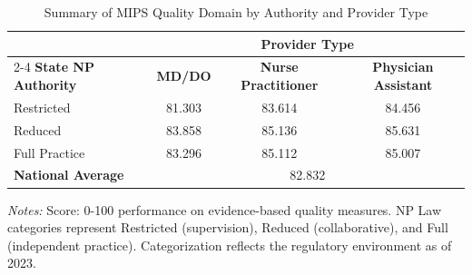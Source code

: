 \begin{table}[htbp]
    \centering
    \caption{Summary of MIPS Quality Domain by Authority and Provider Type}
    \label{tab:mips_quality_score_provtype}
    \vspace{0.2cm}
    \begin{tabular}{lccc}
        \toprule
        & \multicolumn{3}{c}{\textbf{Provider Type}} \\
        \cmidrule(lr){2-4}
        \textbf{State NP Authority} & \textbf{MD/DO} & \textbf{Nurse Practitioner} & \textbf{Physician Assistant} \\
        \midrule
        Restricted & 81.303 & 83.614 & 84.456 \\
        Reduced & 83.858 & 85.136 & 85.631 \\
        Full Practice & 83.296 & 85.112 & 85.007 \\
        \midrule
        \textbf{National Average} & \multicolumn{3}{c}{82.832} \\
        \bottomrule
    \end{tabular}
    \vspace{0.1cm}
    \begin{minipage}{0.85\textwidth}
        \footnotesize \textit{Notes:} Score: 0-100 performance on evidence-based quality measures. NP Law categories represent Restricted (supervision), Reduced (collaborative), and Full (independent practice). Categorization reflects the regulatory environment as of 2023.
    \end{minipage}
\end{table}